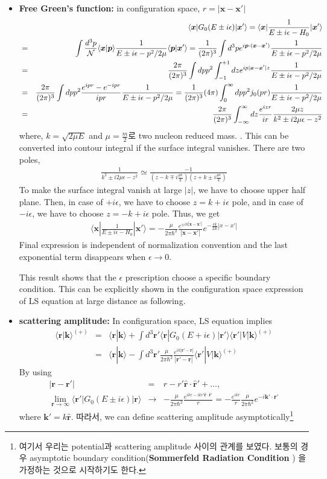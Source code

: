 \documentclass[10pt]{book}
\def\bm{\boldsymbol}
\newcommand{\bea}{\begin{eqnarray}}
\newcommand{\eea}{\end{eqnarray}}
\newcommand{\no}{\nonumber \\}
\def\vp{{\bm p}}
\def\vk{{\bm k}}
\def\vx{{\bm x}}
\def\vr{{\bm r}}
\def\la{\langle}
\def\ra{\rangle}
\begin{document}
\begin{itemize}
\item {\bf Free Green's function:} in configuration space, $r=|\vx-\vx'|$
\bea
& &\la \vx|G_0(E\pm i\epsilon)|\vx'\ra=\la \vx|\frac{1}{E\pm i\epsilon-H_0}|\vx'\ra \no 
&=&\int \frac{d^3 p}{\cal N} \la \vx|\vp\ra\frac{1}{E\pm i\epsilon-p^2/2\mu}\la \vp|\vx'\ra 
=\frac{1}{(2\pi)^3}\int d^3 p e^{i\vp\cdot(\vx-\vx')} \frac{1}{E\pm i\epsilon-p^2/{2\mu}}\no
&=&\frac{2\pi}{(2\pi)^3}\int d p p^2 \int_{-1}^{+1} dz e^{i p|\vx-\vx'| z} \frac{1}{E\pm i\epsilon-p^2/{2\mu}}\no
&=&\frac{2\pi}{(2\pi)^3}\int d p p^2\frac{e^{i p r }-e^{-i p r } }{ip r} \frac{1}{E\pm i\epsilon-p^2/{2\mu}}
  = \frac{1}{(2\pi)^3}(4\pi)\int_0^\infty d p p^2 j_0(p r)
     \frac{1}{E\pm i\epsilon-p^2/2\mu} \no 
&=&  \frac{2\pi}{(2\pi)^3}\int^\infty_{-\infty} d z \frac{e^{i z r } }{i r} \frac{2\mu z }{k^2\pm i2\mu \epsilon-z^2} 
\eea 
where, $k=\sqrt{2\mu E}$ and $\mu=\frac{m}{2}$로 two nucleon reduced mass. .
 This can be converted into contour integral
 if the surface integral vanishes. There are two poles,
 \bea 
 \frac{1}{k^2\pm i2\mu \epsilon-z^2}
 \simeq \frac{-1}{(z-k \mp i\frac{\mu\epsilon}{k}  )(z+k  \pm i\frac{\mu\epsilon}{k}) } 
 \eea  
 To make the surface integral vanish at large $|z|$, we have to choose upper half plane.
 Then,  in case of $+i\epsilon$, we have to choose $z=k+i\epsilon$ pole,
 and in case of $-i\epsilon$, we have to choose $z=-k+i\epsilon$ pole.
Thus, we get
\bea 
\boxed{
\la \vx|\frac{1}{E\pm i\epsilon-H_0}|\vx'\ra 
= -\frac{\mu}{2\pi\hbar^2}\frac{e^{\pm i k|\vx-\vx'|}}{|\vx-\vx'|}e^{-\frac{\epsilon k}{2E}|x-x'|}
}
\eea 
Final expression is independent of normalization
convention and the last exponential term disappears when $\epsilon\to 0$.

This result shows that the $\epsilon$ prescription choose a specific boundary condition. 
This can be explicitly shown in the configuration space expression of LS equation
at large distance as following.

\item {\bf scattering amplitude:} In configuration space, LS equation implies
\bea
\la\vr|\vk\ra^{(+)}
&=&\la \vr|\vk\ra+\int d^3\vr' \la \vr|G_0(E+i\epsilon)|\vr' \ra
 \la\vr'|V|\vk\ra^{(+)} \no 
&=&\la \vr|\vk\ra- \int d^3\vr'\frac{\mu}{2\pi\hbar^2}
   \frac{e^{ik|\vr'-\vr|}}{|\vr'-\vr|}\la \vr'|V|\vk\ra^{(+)}
\eea
By using
\bea
|\vr-\vr'|&=& r-r' {\hat \vr}\cdot{\hat \vr'}+\dots,\no 
\lim_{\vr\to \infty}\la \vr'|G_0(E\pm i\epsilon)|\vr \ra
   &\to& -\frac{\mu}{2\pi\hbar^2}
   \frac{e^{ikr-ikr'\hat{\vr}\cdot{\hat\vr}'}}{r}
   = -\frac{e^{ikr}}{r}\frac{\mu}{2\pi\hbar^2}e^{-i\vk' \cdot{\vr}'}
\eea
where $\vk'=k\hat{\vr}$.
따라서, 
we can define scattering amplitude asymptotically\footnote{
여기서 우리는 potential과 scattering amplitude 사이의 관계를 보였다. 
보통의 경우 asymptotic boundary  condition({\bf Sommerfeld Radiation Condition}
)
을 가정하는 것으로 
시작하기도 한다.

}
\end{itemize}
\end{document}
